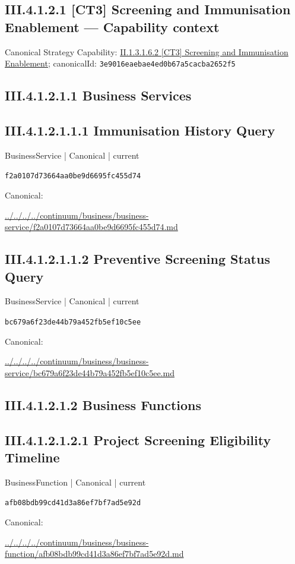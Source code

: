 \documentclass[10pt,a4paper]{article}
\begin{document}
\subsection*{III.4.1.2.1 [CT3] Screening and Immunisation Enablement — Capability context}
Canonical Strategy Capability: \hyperref[element-3e9016eaebae4ed0b67a5cacba2652f5]{II.1.3.1.6.2 [CT3] Screening and Immunisation Enablement}; canonicalId: \texttt{3e9016eaebae4ed0b67a5cacba2652f5}\par
\subsection*{III.4.1.2.1.1 Business Services}
\subsection*{III.4.1.2.1.1.1 Immunisation History Query}
\label{element-f2a0107d73664aa0be9d6695fc455d74}
{\small BusinessService | Canonical | current}\par
\texttt{f2a0107d73664aa0be9d6695fc455d74}\par
Canonical: \par
{\footnotesize\url{../../../../continuum/business/business-service/f2a0107d73664aa0be9d6695fc455d74.md}}\par
\subsection*{III.4.1.2.1.1.2 Preventive Screening Status Query}
\label{element-bc679a6f23de44b79a452fb5ef10c5ee}
{\small BusinessService | Canonical | current}\par
\texttt{bc679a6f23de44b79a452fb5ef10c5ee}\par
Canonical: \par
{\footnotesize\url{../../../../continuum/business/business-service/bc679a6f23de44b79a452fb5ef10c5ee.md}}\par
\subsection*{III.4.1.2.1.2 Business Functions}
\subsection*{III.4.1.2.1.2.1 Project Screening Eligibility Timeline}
\label{element-afb08bdb99cd41d3a86ef7bf7ad5e92d}
{\small BusinessFunction | Canonical | current}\par
\texttt{afb08bdb99cd41d3a86ef7bf7ad5e92d}\par
Canonical: \par
{\footnotesize\url{../../../../continuum/business/business-function/afb08bdb99cd41d3a86ef7bf7ad5e92d.md}}\par
\end{document}
